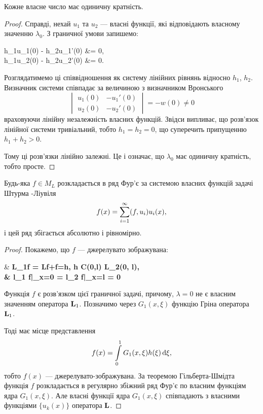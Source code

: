 \begin{proposition}
	Кожне власне число має одиничну кратність.
\end{proposition}

\begin{proof}
	Справді, нехай $u_1$ та $u_2$ --- власні функції, які відповідають власному значенню $\lambda_0$. З граничної умови запишемо:
	\begin{system}
		h_1u_1(0) - h_2u_1'(0) &= 0, \\
		h_1u_2(0) - h_2u_2'(0) &= 0.
	\end{system}

	Розглядатимемо ці співвідношення як систему лінійних рівнянь відносно $h_1$, $h_2$. Визначник системи співпадає за величиною з визначником Вронського 
	\begin{equation}
		\begin{vmatrix} u_1(0) & -u_1'(0) \\ u_2(0) & -u_2'(0)\end{vmatrix} = -w(0) \ne 0
	\end{equation}
	враховуючи лінійну незалежність власних функцій. Звідси випливає, що розв'язок лінійної системи тривіальний, тобто $h_1 = h_2 = 0$, що суперечить припущенню $h_1 + h_2 > 0$. \medskip

	Тому ці розв'язки лінійно залежні. Це і означає, що $\lambda_0$ має одиничну кратність, тобто просте.
\end{proof}

\begin{theorem}
	Будь-яка $f \in M_L$ розкладається в ряд Фур'є за системою власних функцій задачі Штурма -Ліувіля
	\begin{equation}
		f(x) = \Sum_{i=1}^\infty (f, u_i) u_i(x),
	\end{equation} 
	і цей ряд збігається абсолютно і рівномірно.
\end{theorem}

\begin{proof}
	Покажемо, що $f$ --- джерелувато зображувана:
	\begin{system}
		& \bf{L}_1f = \bf{L}f+f=h, \quad h \in C(0,l) \cap L_2(0, l), \\
		& l_1 f|_{x=0} = l_2 f|_{x=l} = 0
	\end{system}

	Функція $f$ є розв'язком цієї граничної задачі, причому, $\lambda = 0$ не є власним значенням оператора $\bf{L}_1$. Позначимо через $G_1(x, \xi)$ функцію Гріна оператора $\bf{L}_1$. \medskip

	Тоді має місце представлення
	\begin{equation}
		f(x) = \Int_0^1 G_1(x, \xi) h(\xi) \diff \xi,
	\end{equation}
	тобто $f(x)$ --- джерелувато-зображувана. За теоремою Гільберта-Шмідта функція $f$ розкладається в регулярно збіжний ряд Фур'є по власним функціям ядра $G_1(x, \xi)$. Але власні функції ядра $G_1(x, \xi)$ співпадають з власними функціями $\{u_k(x)\}$ оператора $\bf{L}$.
\end{proof}

